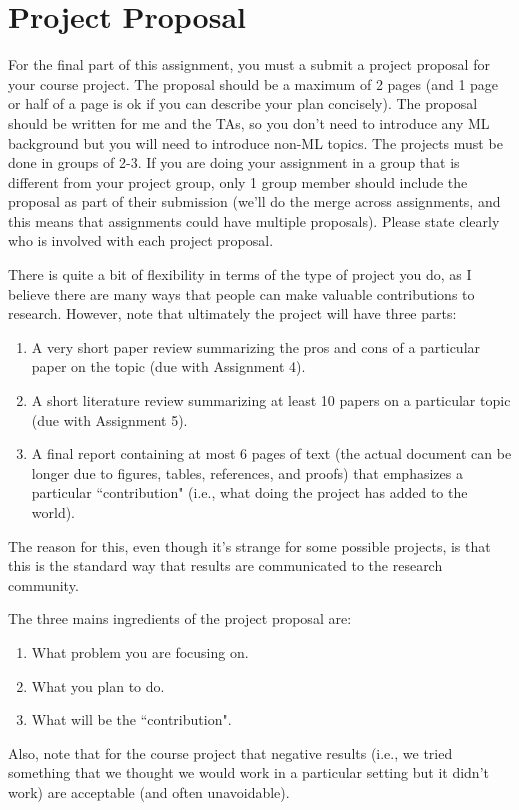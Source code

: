\documentclass{article}
\def\blu#1{{\color{blu}#1}}
\def\enum#1{\begin{enumerate}#1\end{enumerate}}
\begin{document}
\section{Project Proposal}


For the final part of this assignment, you must a \blu{submit a project proposal} for your course project. The proposal should be a maximum of 2 pages (and 1 page or half of a page is ok if you can describe your plan concisely). The proposal should be written for me and the TAs, so you don't need to introduce any ML background but you will need to introduce non-ML topics. The projects must be done in groups of 2-3. If you are doing your assignment in a group that is different from your project group, only  1 group member should include the proposal as part of their submission (we'll do the merge across assignments, and this means that assignments could have multiple proposals). Please state clearly who is involved with each project proposal.

There is quite a bit of flexibility in terms of the type of project you do, as I believe there are many ways that people can make valuable contributions to research. However, note that ultimately the project will have three parts:
\enum{
\item A very short paper review summarizing the pros and cons of a particular paper on the topic (due with Assignment 4).
\item A short literature review summarizing at least 10 papers on a particular topic (due with Assignment 5).
\item A final report containing at most 6 pages of text (the actual document can be longer due to figures, tables, references, and proofs) that emphasizes a particular ``contribution" (i.e., what doing the project has added to the world).
}
The reason for this, even though it's strange for some possible projects, is that this is the standard way that results are communicated to the research community.

\blu{The three mains ingredients of the project proposal are:
\begin{enumerate}
\item What problem you are focusing on.
\item What you plan to do.
\item What will be the ``contribution".
\end{enumerate}
}
Also, note that for the course project that negative results (i.e., we tried something that we thought we would work in a particular setting but it didn't work) are acceptable (and often unavoidable).
\end{document}
